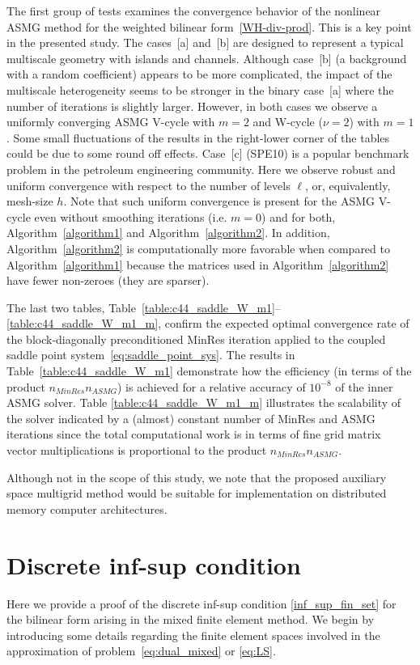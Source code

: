 \documentclass[11pt]{amsart}
\numberwithin{equation}{section}
\theoremstyle{definition}\newtheorem{example}{Example}[section]
\begin{document}
The first group of tests examines
the convergence behavior of the nonlinear ASMG method
for the weighted bilinear 
form~\eqref{WH-div-prod}. 
This is a key 
point in the presented study.
The cases~[a] and~[b] are designed to represent a typical multiscale geometry with
islands and channels. Although case~[b] (a background with a random coefficient)
appears to be more complicated, the impact of the multiscale heterogeneity seems to
be stronger in the binary case~[a] where the number of iterations is slightly larger. 
However, in both cases we
observe a uniformly converging
ASMG V-cycle 
with $m=2$ and W-cycle ($\nu=2$) with $m=1$. Some small 
fluctuations of the results
in the right-lower corner of the tables could be due to some round off effects. 
Case~[c] (SPE10) is
a popular benchmark problem in the petroleum engineering
community. Here we observe robust and uniform convergence with respect
to the number of levels $\ell$, or, equivalently, mesh-size $h$. Note
that such uniform convergence is present for the ASMG V-cycle even
without smoothing iterations (i.e.  $m=0$) and for both,
Algorithm~\ref{algorithm1} and Algorithm~\ref{algorithm2}. In
addition, Algorithm~\ref{algorithm2} is computationally more favorable
when compared to Algorithm~\ref{algorithm1} because
the matrices used in Algorithm~\ref{algorithm2}
have fewer non-zeroes (they are sparser).

The last two tables,
Table~\ref{table:c44_saddle_W_m1}--\ref{table:c44_saddle_W_m1_m},
confirm the expected optimal convergence rate
of the block-diagonally preconditioned MinRes iteration applied
to the coupled saddle point system~\eqref{eq:saddle_point_sys}.
The results in Table~\ref{table:c44_saddle_W_m1} demonstrate 
how the efficiency (in terms of the product $n_{MinRes} n_{ASMG}$) is achieved 
for a relative accuracy of $10^{-8}$ of the inner ASMG solver. 
Table \ref{table:c44_saddle_W_m1_m} illustrates
the scalability of the solver
indicated by a (almost) constant number of  MinRes and ASMG
iterations since the total computational work is
in terms of fine grid matrix vector multiplications is proportional to
the product $n_{MinRes}n_{ASMG}$.

Although not in the scope of this study, we note that the proposed
auxiliary space multigrid method would be suitable for implementation
on distributed memory computer architectures.

\appendix
\section{Discrete inf-sup condition}\label{append}
Here we provide a proof of the discrete inf-sup condition
\eqref{inf_sup_fin_set} for the bilinear form arising in the mixed
finite element method.  We begin by introducing some details regarding
the finite element spaces involved in the approximation of
problem~\eqref{eq:dual_mixed} or \eqref{eq:LS}.
\end{document}
